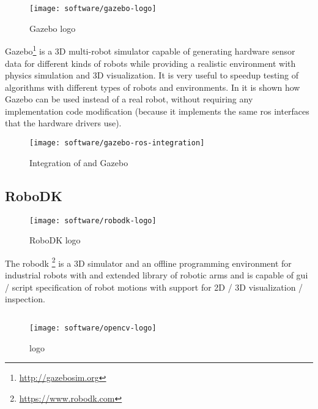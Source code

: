 \begin{wrapfigure}{r}{0.23\textwidth}
	\centering
	\vspace*{-2em}
	\texttt{[image: software/gazebo-logo]}
	\caption{Gazebo logo}
	\label{fig:gazebo-logo}
\end{wrapfigure}


Gazebo\footnote{\url{http://gazebosim.org}} is a 3D multi-robot simulator capable of generating hardware sensor data for different kinds of robots while providing a realistic environment with physics simulation and 3D visualization. It is very useful to speedup testing of algorithms with different types of robots and environments. In  it is shown how Gazebo can be used instead of a real robot, without requiring any implementation code modification (because it implements the same \gls{ros} interfaces that the hardware drivers use).

\begin{figure}[H]
	\centering
	\texttt{[image: software/gazebo-ros-integration]}
	\caption[Integration of  and Gazebo]{Integration of  and Gazebo\protect\footnotemark}
	\label{fig:gazebo-ros-integration}
\end{figure}


\subsection{RoboDK}

\begin{wrapfigure}{r}{0.23\textwidth}
	\centering
	\vspace*{-2em}
	\texttt{[image: software/robodk-logo]}
	\caption{RoboDK logo}
	\label{fig:robodk-logo}
\end{wrapfigure}

The \gls{robodk} \footnote{\url{https://www.robodk.com}} is a 3D simulator and an offline programming environment for industrial robots with and extended library of robotic arms and is capable of \gls{gui} / script specification of robot motions with support for 2D / 3D visualization / inspection.


\subsection{}

\begin{wrapfigure}{r}{0.23\textwidth}
	\centering
	\vspace*{-2em}
	\texttt{[image: software/opencv-logo]}
	\caption{ logo}
	\label{fig:opencv-logo}
\end{wrapfigure}

